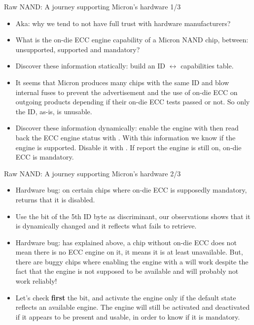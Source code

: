 \documentclass[aspectratio=169,obeyspaces,spaces,hyphens,dvipsnames]{beamer}
\begin{document}
\begin{frame}{Raw NAND: A journey supporting Micron's hardware 1/3}
  \begin{itemize}
  \item Aka: why we tend to not have full trust with hardware
    manufacturers?
  \item [Plot] What is the on-die ECC engine capability of a Micron
    NAND chip, between: unsupported, supported and mandatory?
  \item [Solution] Discover these information statically: build an
    ID $\leftrightarrow$ capabilities table.
  \item [Issue 1] It seems that Micron produces many chips with the
    same ID and blow internal fuses to prevent the advertisement and the
    use of on-die ECC on outgoing products depending if their on-die ECC
    tests passed or not. So only the ID, as-is, is unusable.
  \item [Fix 1] Discover these information dynamically: enable the
    engine with  then read back the ECC engine
    status with . With this information we know
    if the engine is supported. Disable it with
    . If  report the
    engine is still on, on-die ECC is mandatory.
  \end{itemize}
\end{frame}

\begin{frame}{Raw NAND: A journey supporting Micron's hardware 2/3}
  \begin{itemize}
  \item [Issue 2] Hardware bug: on certain chips where on-die ECC is
    supposedly mandatory,  returns that it is
    disabled.
  \item [Fix 2] Use the  bit of the 5th ID byte
    as discriminant, our observations shows that it is dynamically
    changed and it reflects what  fails to
    retrieve.
  \item [Issue 3] Hardware bug: has explained above, a chip without
    on-die ECC does not mean there is no ECC engine on it, it means it
    is at least unavailable. But, there are buggy chips where enabling
    the engine with a  will work despite the fact
    that the engine is not supposed to be available and will probably
    not work reliably!
  \item [Fix 3] Let's check {\bf first} the  bit, and
    activate the engine only if the default state reflects an available
    engine. The engine will still be activated and deactivated if it
    appears to be present and usable, in order to know if it is
    mandatory.
  \end{itemize}
\end{frame}
\end{document}
